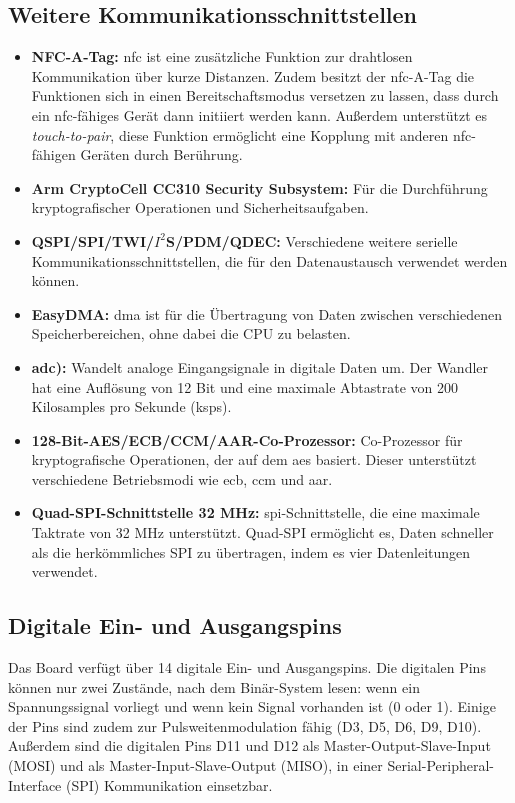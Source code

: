\subsection{Weitere Kommunikationsschnittstellen}
\cite{Ard.2024}
	\begin{itemize}
		\item \textbf{NFC-A-Tag:} \ac{nfc} ist eine zusätzliche Funktion zur drahtlosen Kommunikation über kurze Distanzen. Zudem besitzt der \ac{nfc}-A-Tag die Funktionen sich in einen Bereitschaftsmodus versetzen zu lassen, dass durch ein \ac{nfc}-fähiges Gerät dann initiiert werden kann. Außerdem unterstützt es \textit{touch-to-pair}, diese Funktion ermöglicht eine Kopplung mit anderen \ac{nfc}-fähigen Geräten durch Berührung.
		\item \textbf{Arm CryptoCell CC310 Security Subsystem:} Für die Durchführung kryptografischer Operationen und Sicherheitsaufgaben.\\ \cite{NrdSem.2024}
		\item \textbf{QSPI/SPI/TWI/$I^2$S/PDM/QDEC:} Verschiedene weitere serielle Kommunikationsschnittstellen, die für den Datenaustausch verwendet werden können.
		\item \textbf{EasyDMA:} \ac{dma} ist für die Übertragung von Daten zwischen verschiedenen Speicherbereichen, ohne dabei die CPU zu belasten.\cite{Gehrke.2022}
		\item \textbf{\ac{adc}):} Wandelt analoge Eingangsignale in digitale Daten um. Der Wandler hat eine Auflösung von 12 Bit und eine maximale Abtastrate von 200 Kilosamples pro Sekunde (ksps).
		\item \textbf{128-Bit-AES/ECB/CCM/AAR-Co-Prozessor:} Co-Prozessor für kryptografische Operationen, der auf dem \ac{aes} basiert. Dieser unterstützt verschiedene Betriebsmodi wie \ac{ecb}, \ac{ccm} und \ac{aar}. \cite{NrdSem2.2024}
		\item \textbf{Quad-SPI-Schnittstelle 32 MHz:} \ac{spi}-Schnittstelle, die eine maximale Taktrate von 32 MHz unterstützt. Quad-SPI ermöglicht es, Daten schneller als die herkömmliches SPI zu übertragen, indem es vier Datenleitungen verwendet.\cite{NrdSem3.2023}
	\end{itemize}

\subsection{Digitale Ein- und Ausgangspins}
Das Board verfügt über 14 digitale Ein- und Ausgangspins. Die digitalen Pins können nur zwei Zustände, nach dem Binär-System lesen: wenn ein Spannungssignal vorliegt und wenn kein Signal vorhanden ist (0 oder 1). Einige der Pins sind zudem zur Pulsweitenmodulation fähig (D3, D5, D6, D9, D10). Außerdem sind die digitalen Pins D11 und D12 als Master-Output-Slave-Input (MOSI) und als Master-Input-Slave-Output (MISO), in einer Serial-Peripheral-Interface (SPI) Kommunikation einsetzbar.\cite{Ard.2024}

